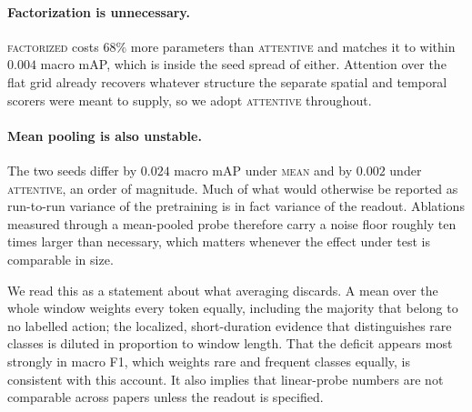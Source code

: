 \paragraph{Factorization is unnecessary.} \textsc{factorized} costs $68\%$ more
parameters than \textsc{attentive} and matches it to within $0.004$ macro mAP, which is
inside the seed spread of either. Attention over the flat grid already recovers whatever
structure the separate spatial and temporal scorers were meant to supply, so we adopt
\textsc{attentive} throughout.

\paragraph{Mean pooling is also unstable.} The two seeds differ by $0.024$ macro mAP
under \textsc{mean} and by $0.002$ under \textsc{attentive}, an order of magnitude. Much
of what would otherwise be reported as run-to-run variance of the pretraining is in fact
variance of the readout. Ablations measured through a mean-pooled probe therefore carry
a noise floor roughly ten times larger than necessary, which matters whenever the effect
under test is comparable in size.

We read this as a statement about what averaging discards. A mean over the whole window
weights every token equally, including the majority that belong to no labelled action;
the localized, short-duration evidence that distinguishes rare classes is diluted in
proportion to window length. That the deficit appears most strongly in macro F1, which
weights rare and frequent classes equally, is consistent with this account. It also
implies that linear-probe numbers are not comparable across papers unless the readout is
specified.
